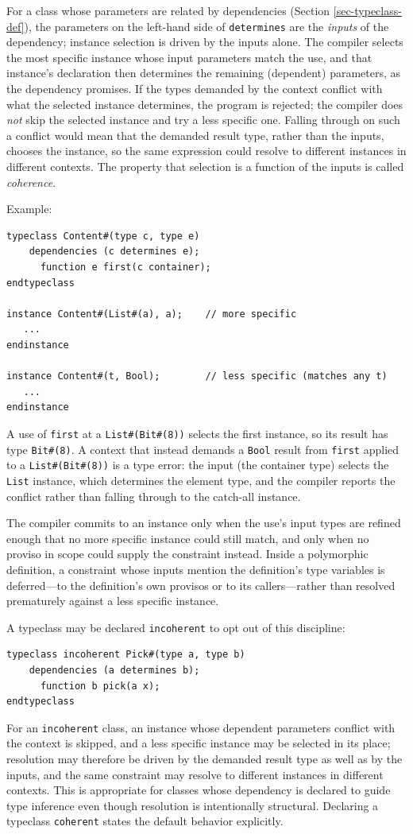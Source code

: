 \documentclass[twoside,letterpaper]{article}
\begin{document}
For a class whose parameters are related by dependencies (Section
\ref{sec-typeclass-def}), the parameters on the left-hand side of
\texttt{determines} are the \emph{inputs} of the dependency; instance
selection is driven by the inputs alone.  The compiler selects the
most specific instance whose input parameters match the use, and that
instance's declaration then determines the remaining (dependent)
parameters, as the dependency promises.  If the types demanded by the
context conflict with what the selected instance determines, the
program is rejected; the compiler does \emph{not} skip the selected
instance and try a less specific one.  Falling through on such a
conflict would mean that the demanded result type, rather than the
inputs, chooses the instance, so the same expression could resolve to
different instances in different contexts.  The property that
selection is a function of the inputs is called \emph{coherence}.

Example:
\begin{verbatim}
typeclass Content#(type c, type e)
    dependencies (c determines e);
      function e first(c container);
endtypeclass

instance Content#(List#(a), a);    // more specific
   ...
endinstance

instance Content#(t, Bool);        // less specific (matches any t)
   ...
endinstance
\end{verbatim}
A use of \texttt{first} at a \texttt{List\#(Bit\#(8))} selects the
first instance, so its result has type \texttt{Bit\#(8)}.  A context
that instead demands a \texttt{Bool} result from
\texttt{first} applied to a \texttt{List\#(Bit\#(8))} is a type error:
the input (the container type) selects the \texttt{List} instance,
which determines the element type, and the compiler reports the
conflict rather than falling through to the catch-all instance.

The compiler commits to an instance only when the use's input types
are refined enough that no more specific instance could still match,
and only when no proviso in scope could supply the constraint
instead.  Inside a polymorphic definition, a constraint whose inputs
mention the definition's type variables is deferred---to the
definition's own provisos or to its callers---rather than resolved
prematurely against a less specific instance.

A typeclass may be declared \texttt{incoherent} to opt out of this
discipline:
\begin{verbatim}
typeclass incoherent Pick#(type a, type b)
    dependencies (a determines b);
      function b pick(a x);
endtypeclass
\end{verbatim}
For an \texttt{incoherent} class, an instance whose dependent
parameters conflict with the context is skipped, and a less specific
instance may be selected in its place; resolution may therefore be
driven by the demanded result type as well as by the inputs, and the
same constraint may resolve to different instances in different
contexts.  This is appropriate for classes whose dependency is
declared to guide type inference even though resolution is
intentionally structural.  Declaring a typeclass \texttt{coherent}
states the default behavior explicitly.
\end{document}
